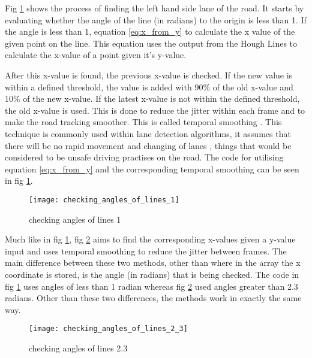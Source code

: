 \documentclass[conference]{IEEEtran}
\begin{document}
Fig \ref{fig:checking_angles_of_lines_1} shows the process of finding the left hand side lane of the road. It starts by evaluating whether the angle of the line (in radians) to the origin is less than 1. If the angle is less than 1, equation \ref{eq:x_from_y} to calculate the x value of the given point on the line. This equation uses the output from the Hough Lines to calculate the x-value of a point given it's y-value. 

After this x-value is found, the previous x-value is checked. If the new value is within a defined threshold, the value is added with $90\%$ of the old x-value and $10\%$ of the new x-value. If the latest x-value is not within the defined threshold, the old x-value is used. This is done to reduce the jitter within each frame and to make the road tracking smoother. This is called temporal smoothing \cite{temporal_smoothing}. This technique is commonly used within lane detection algorithms, it assumes that there will be no rapid movement and changing of lanes \cite{deeplane}, things that would be considered to be unsafe driving practises on the road. The code for utilising equation \ref{eq:x_from_y} and the corresponding temporal smoothing can be seen in fig \ref{fig:checking_angles_of_lines_1}.

\begin{figure}[H]
\centerline{\texttt{[image: checking\_angles\_of\_lines\_1]}}
\caption{checking angles of lines 1}
\label{fig:checking_angles_of_lines_1}
\end{figure}

Much like in fig \ref{fig:checking_angles_of_lines_1}, fig \ref{fig:checking_angles_of_lines_2.3}  aims to find the corresponding x-values given a y-value input and uses temporal smoothing to reduce the jitter between frames. The main difference between these two methods, other than where in the array the x coordinate is stored, is the angle (in radians) that is being checked. The code in fig \ref{fig:checking_angles_of_lines_1} uses angles of less than 1 radian whereas fig \ref{fig:checking_angles_of_lines_2.3} used angles greater than 2.3 radians. Other than these two differences, the methods work in exactly the same way. 

\begin{figure}[H]
\centerline{\texttt{[image: checking\_angles\_of\_lines\_2\_3]}}
\caption{checking angles of lines 2.3}
\label{fig:checking_angles_of_lines_2.3}
\end{figure}
\end{document}
